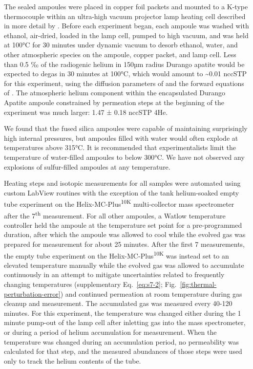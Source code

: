 The sealed ampoules were placed in copper foil packets and mounted to a K-type thermocouple within an ultra-high vacuum projector lamp heating cell described in more detail by \citet{farley1999}. Before each experiment began, each ampoule was washed with ethanol, air-dried, loaded in the lamp cell, pumped to high vacuum, and was held at 100°C for 30 minutes under dynamic vacuum to desorb ethanol, water, and other atmospheric species on the ampoule, copper packet, and lamp cell. Less than 0.5 ‰ of the radiogenic helium in 150µm radius Durango apatite would be expected to degas in 30 minutes at 100°C, which would amount to \textasciitilde0.01 nccSTP for this experiment, using the diffusion parameters of \citet{farley2000} and the forward equations of \citet{fechtigkalbitzer1966}. The atmospheric helium component within the encapsulated Durango Apatite ampoule constrained by permeation steps at the beginning of the experiment was much larger: 1.47 ± 0.18 nccSTP 4He.

We found that the fused silica ampoules were capable of maintaining surprisingly high internal pressures, but ampoules filled with water would often explode at temperatures above 315°C. It is recommended that experimentalists limit the temperature of water-filled ampoules to below 300°C. We have not observed any explosions of sulfur-filled ampoules at any temperature. 

Heating steps and isotopic measurements for all samples were automated using custom LabView routines with the exception of the tank helium-soaked empty tube experiment on the Helix-MC-Plus\textsuperscript{10K} multi-collector mass spectrometer after the 7\textsuperscript{th} measurement. For all other ampoules, a Watlow temperature controller held the ampoule at the temperature set point for a pre-programmed duration, after which the ampoule was allowed to cool while the evolved gas was prepared for measurement for about 25 minutes. After the first 7 measurements, the empty tube experiment on the Helix-MC-Plus\textsuperscript{10K} was instead set to an elevated temperature manually while the evolved gas was allowed to accumulate continuously in an attempt to mitigate uncertainties related to frequently changing temperatures (supplementary Eq.~\eqref{eq:s7-2}; Fig.~\ref{fig:thermal-perturbation-error}) and continued permeation at room temperature during gas cleanup and measurement. The accumulated gas was measured every 40-120 minutes. For this experiment, the temperature was changed either during the 1 minute pump-out of the lamp cell after inletting gas into the mass spectrometer, or during a period of helium accumulation for measurement. When the temperature was changed during an accumulation period, no permeability was calculated for that step, and the measured abundances of those steps were used only to track the helium contents of the tube.


